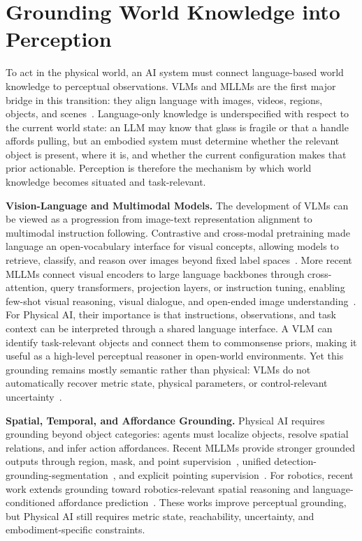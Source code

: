 \section{Grounding World Knowledge into Perception}
\label{sec:vlm-grounding}

To act in the physical world, an AI system must connect language-based world knowledge to perceptual observations. VLMs and MLLMs are the first major bridge in this transition: they align language with images, videos, regions, objects, and scenes~\citep{radford2021learning,jia2021align,alayrac2022flamingo,liu2023llava}. Language-only knowledge is underspecified with respect to the current world state: an LLM may know that glass is fragile or that a handle affords pulling, but an embodied system must determine whether the relevant object is present, where it is, and whether the current configuration makes that prior actionable. Perception is therefore the mechanism by which world knowledge becomes situated and task-relevant.

\noindent\textbf{Vision-Language and Multimodal Models.}
The development of VLMs can be viewed as a progression from image-text representation alignment to multimodal instruction following. Contrastive and cross-modal pretraining made language an open-vocabulary interface for visual concepts, allowing models to retrieve, classify, and reason over images beyond fixed label spaces~\citep{radford2021learning,lu2019vilbert,tan2019lxmert}. More recent MLLMs connect visual encoders to large language backbones through cross-attention, query transformers, projection layers, or instruction tuning, enabling few-shot visual reasoning, visual dialogue, and open-ended image understanding~\citep{team2026qwen3,li2023blip,shen2026fine}. For Physical AI, their importance is that instructions, observations, and task context can be interpreted through a shared language interface. A VLM can identify task-relevant objects and connect them to commonsense priors, making it useful as a high-level perceptual reasoner in open-world environments. Yet this grounding remains mostly semantic rather than physical: VLMs do not automatically recover metric state, physical parameters, or control-relevant uncertainty~\citep{agarwal2025cosmos,liu2025generative,shridhar2022cliport,bear2021physion}.

\noindent\textbf{Spatial, Temporal, and Affordance Grounding.}
Physical AI requires grounding beyond object categories: agents must localize objects, resolve spatial relations, and infer action affordances. Recent MLLMs provide stronger grounded outputs through region, mask, and point supervision~\citep{rasheed2024glammpixelgroundinglarge,lai2024lisa}, unified detection-grounding-segmentation~\citep{xiao2024florence}, and explicit pointing supervision~\citep{deitke2025molmo}. For robotics, recent work extends grounding toward robotics-relevant spatial reasoning and language-conditioned affordance prediction~\citep{chen2024spatialvlm,song2025robospatial,pothiraj2025capture}. These works improve perceptual grounding, but Physical AI still requires metric state, reachability, uncertainty, and embodiment-specific constraints.

